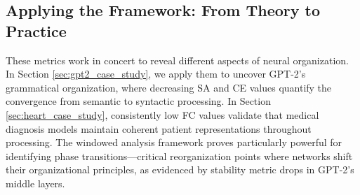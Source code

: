 \subsection{Applying the Framework: From Theory to Practice}

These metrics work in concert to reveal different aspects of neural organization. In Section \ref{sec:gpt2_case_study}, we apply them to uncover GPT-2's grammatical organization, where decreasing SA and CE values quantify the convergence from semantic to syntactic processing. In Section \ref{sec:heart_case_study}, consistently low FC values validate that medical diagnosis models maintain coherent patient representations throughout processing. The windowed analysis framework proves particularly powerful for identifying phase transitions—critical reorganization points where networks shift their organizational principles, as evidenced by stability metric drops in GPT-2's middle layers.

